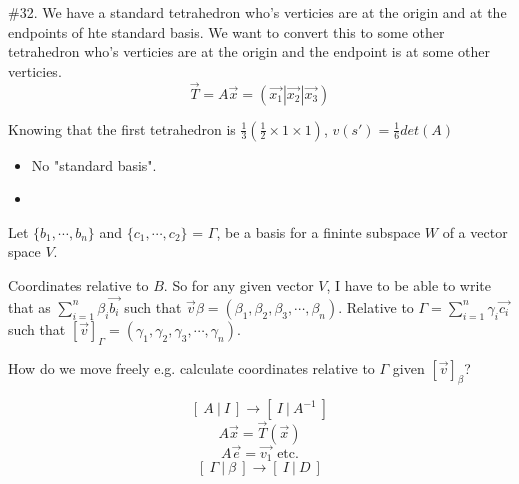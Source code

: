 \#32. We have a standard tetrahedron who's verticies are at the origin and at the endpoints of hte standard basis. We want to convert this to some other tetrahedron who's verticies are at the origin and the endpoint is at some other verticies.
\[\vec{T}=A\vec{x} = \left( \vec{x_1} | \vec{x_2} | \vec{x_3}\right)\]

Knowing that the first tetrahedron is $\frac{1}{3}\left( \frac{1}{2} \times 1 \times 1\right)$, $v(s')=\frac{1}{6}det(A)$

\begin{itemize}
\item No "standard basis".
\item 
\end{itemize}
Let $\{b_1,\cdots,b_n\}$ and $\{c_1,\cdots,c_2\}$ = $\Gamma$, be a basis for a fininte subspace $W$ of a vector space $V$.

Coordinates relative to $B$. So for any given vector $V$, I have to be able to write that as $\displaystyle\sum_{i=1}^{n} \beta_i \vec{b_i}$ such that $ \vec{v} \beta = (\beta_1,\beta_2,\beta_3,\cdots,\beta_n)$. Relative to $\Gamma = \displaystyle\sum_{i=1}^{n}\gamma_i\vec{c_i}$ such that $\left[\vec{v}\right]_{\Gamma} = (\gamma_1,\gamma_2,\gamma_3,\cdots,\gamma_n)$.

How do we move freely e.g. calculate coordinates relative to $\Gamma$ given $\left[\vec{v} \right]_{\beta}$?

\[ \left[\ A\ |\ I\ \right] \to \left[\ I\ |\ A^{-1}\ \right]\]
\[ A\vec{x} = \vec{T}(\vec{x}) \]
\[ A\vec{e} = \vec{v_1} \text{ etc.}\]
\[ \left[\ \Gamma\ |\ \beta\ \right] \to \left[\ I\ |\ D\ \right] \]